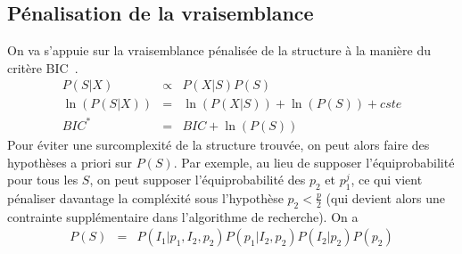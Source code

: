 \documentclass[12pt]{article}
\begin{document}
		\subsection{P\'enalisation de la vraisemblance}
		On va s'appuie sur la vraisemblance p\'enalis\'ee de la structure à la manière du critère BIC~\cite{BIChuard}. 
		\begin{eqnarray}
		P(S|X)&\propto &P(X|S)P(S) \\
		\ln(P(S|X))&=&\ln(P(X|S))+\ln(P(S))+cste \\
		BIC^*&=&BIC +\ln(P(S)) \label{Bicstar}
	\end{eqnarray}	
	Pour \'eviter une surcomplexit\'e de la structure trouv\'ee, on peut alors faire des hypothèses a priori sur $P(S)$. Par exemple, au lieu de supposer l'\'equiprobabilit\'e pour tous les $S$, on peut supposer l'\'equiprobabilit\'e des $p_2$ et $p_1^j$, ce qui vient p\'enaliser davantage la compl\'exit\'e sous l'hypothèse $p_2<\frac{p}{2}$ (qui devient alors une contrainte suppl\'ementaire dans l'algorithme de recherche). 
	On a
	\begin{eqnarray}
		P(S)&=&P(I_1 | p_1,I_2,p_2)P(p_1|I_2,p_2)P(I_2|p_2)P(p_2) %
	\end{eqnarray}		
\end{document}
